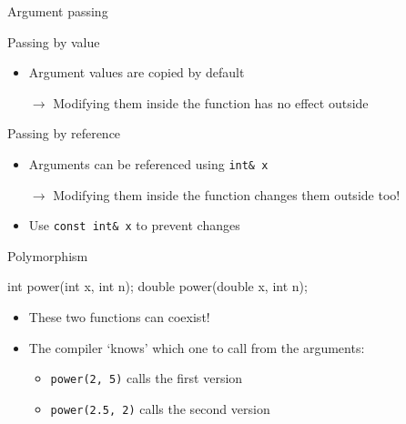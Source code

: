 \begin{frame}[fragile]{Argument passing}
    \begin{block}{Passing by value}
        \begin{itemize}
            \item Argument values are \alert{copied} by default
            \item[$\rightarrow$] Modifying them inside the function has no
                                 effect outside
        \end{itemize}
    \end{block}
    \begin{block}{Passing by reference}
        \begin{itemize}
            \item Arguments can be referenced using \texttt{int& x}
            \item[$\rightarrow$] Modifying them inside the function changes them
                                 outside too!
            \item Use \texttt{const int& x} to prevent changes
        \end{itemize}
    \end{block}
\end{frame}

\begin{frame}[fragile]{Polymorphism}
    \begin{cpp}
        int power(int x, int n);
        double power(double x, int n);
    \end{cpp}
    \vspace{-1em}
    \begin{itemize}
        \item These two functions can coexist!
        \item The compiler `knows' which one to call from the arguments:
              \begin{itemize}
                  \item \texttt{power(2, 5)} calls the first version
                  \item \texttt{power(2.5, 2)} calls the second version
              \end{itemize}
    \end{itemize}
\end{frame}



